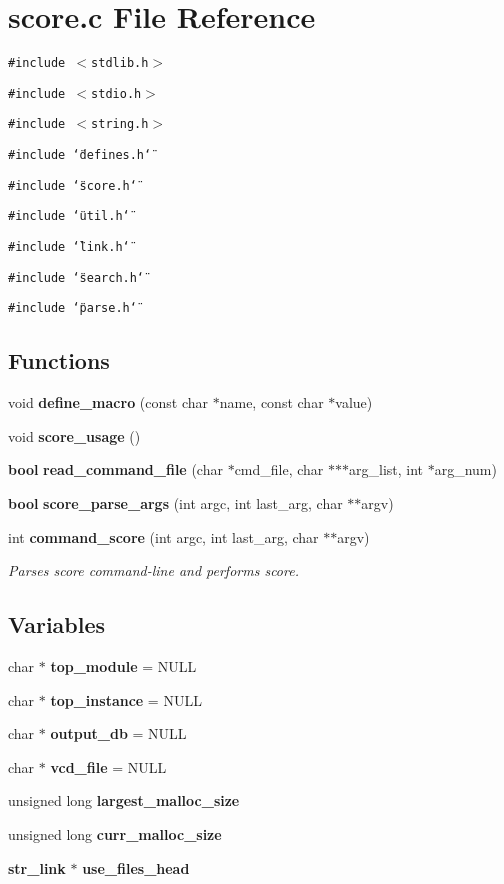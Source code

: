\section{score.c File Reference}
\label{score_8c}
{\tt \#include $<$stdlib.h$>$}\par
{\tt \#include $<$stdio.h$>$}\par
{\tt \#include $<$string.h$>$}\par
{\tt \#include \char`\"{}defines.h\char`\"{}}\par
{\tt \#include \char`\"{}score.h\char`\"{}}\par
{\tt \#include \char`\"{}util.h\char`\"{}}\par
{\tt \#include \char`\"{}link.h\char`\"{}}\par
{\tt \#include \char`\"{}search.h\char`\"{}}\par
{\tt \#include \char`\"{}parse.h\char`\"{}}\par
\subsection*{Functions}
\begin{CompactItemize}
\item 
void {\bf define\_\-macro} (const char $\ast$name, const char $\ast$value)
\item 
void {\bf score\_\-usage} ()
\item 
{\bf bool} {\bf read\_\-command\_\-file} (char $\ast$cmd\_\-file, char $\ast$$\ast$$\ast$arg\_\-list, int $\ast$arg\_\-num)
\item 
{\bf bool} {\bf score\_\-parse\_\-args} (int argc, int last\_\-arg, char $\ast$$\ast$argv)
\item 
int {\bf command\_\-score} (int argc, int last\_\-arg, char $\ast$$\ast$argv)
\begin{CompactList}\small\item\em Parses score command-line and performs score.\item\end{CompactList}\end{CompactItemize}
\subsection*{Variables}
\begin{CompactItemize}
\item 
char $\ast$ {\bf top\_\-module} = NULL
\item 
char $\ast$ {\bf top\_\-instance} = NULL
\item 
char $\ast$ {\bf output\_\-db} = NULL
\item 
char $\ast$ {\bf vcd\_\-file} = NULL
\item 
unsigned long {\bf largest\_\-malloc\_\-size}
\item 
unsigned long {\bf curr\_\-malloc\_\-size}
\item 
{\bf str\_\-link} $\ast$ {\bf use\_\-files\_\-head}
\end{CompactItemize}



